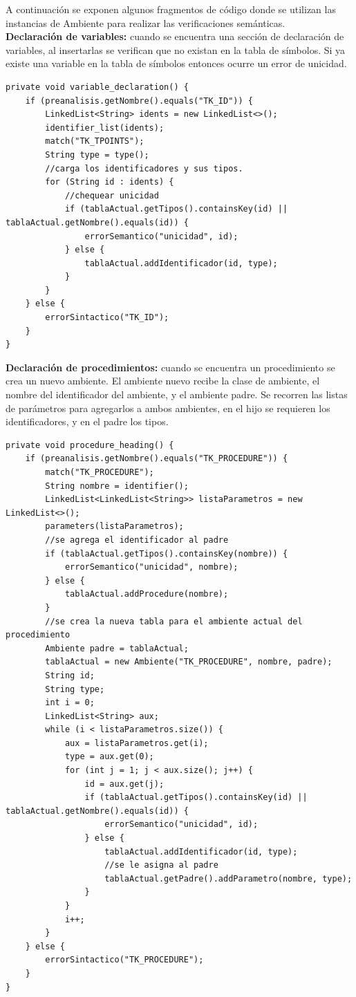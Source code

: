 A continuación se exponen algunos fragmentos de código donde se utilizan las instancias de Ambiente para realizar las verificaciones semánticas.\\

\textbf{Declaración de variables:} cuando se encuentra una sección de declaración de variables, al insertarlas se verifican que no existan en la tabla de símbolos. Si ya existe una variable en la tabla de símbolos entonces ocurre un error de unicidad.

\begin{verbatim}
private void variable_declaration() {
	if (preanalisis.getNombre().equals("TK_ID")) {
		LinkedList<String> idents = new LinkedList<>();
		identifier_list(idents);
		match("TK_TPOINTS");
		String type = type();
		//carga los identificadores y sus tipos.
		for (String id : idents) {
			//chequear unicidad
			if (tablaActual.getTipos().containsKey(id) || tablaActual.getNombre().equals(id)) {
				errorSemantico("unicidad", id);
			} else {
				tablaActual.addIdentificador(id, type);
			}
		}
	} else {
		errorSintactico("TK_ID");
	}
}
\end{verbatim}

\textbf{Declaración de procedimientos:} cuando se encuentra un procedimiento se crea un nuevo ambiente. El ambiente nuevo recibe la clase de ambiente, el nombre del identificador del ambiente, y el ambiente padre. Se recorren las listas de parámetros para agregarlos a ambos ambientes, en el hijo se requieren los identificadores, y en el padre los tipos. 

\begin{verbatim}
private void procedure_heading() {
	if (preanalisis.getNombre().equals("TK_PROCEDURE")) {
		match("TK_PROCEDURE");
		String nombre = identifier();
		LinkedList<LinkedList<String>> listaParametros = new LinkedList<>();
		parameters(listaParametros);
		//se agrega el identificador al padre
		if (tablaActual.getTipos().containsKey(nombre)) {
			errorSemantico("unicidad", nombre);
		} else {
			tablaActual.addProcedure(nombre);
		}
		//se crea la nueva tabla para el ambiente actual del procedimiento
		Ambiente padre = tablaActual;
		tablaActual = new Ambiente("TK_PROCEDURE", nombre, padre);
		String id;
		String type;
		int i = 0;
		LinkedList<String> aux;
		while (i < listaParametros.size()) {
			aux = listaParametros.get(i);
			type = aux.get(0);
			for (int j = 1; j < aux.size(); j++) {
				id = aux.get(j);
				if (tablaActual.getTipos().containsKey(id) || tablaActual.getNombre().equals(id)) {
					errorSemantico("unicidad", id);
				} else {
					tablaActual.addIdentificador(id, type);
					//se le asigna al padre 
					tablaActual.getPadre().addParametro(nombre, type);
				}
			}
			i++;
		}
	} else {
		errorSintactico("TK_PROCEDURE");
	}
}
\end{verbatim}

